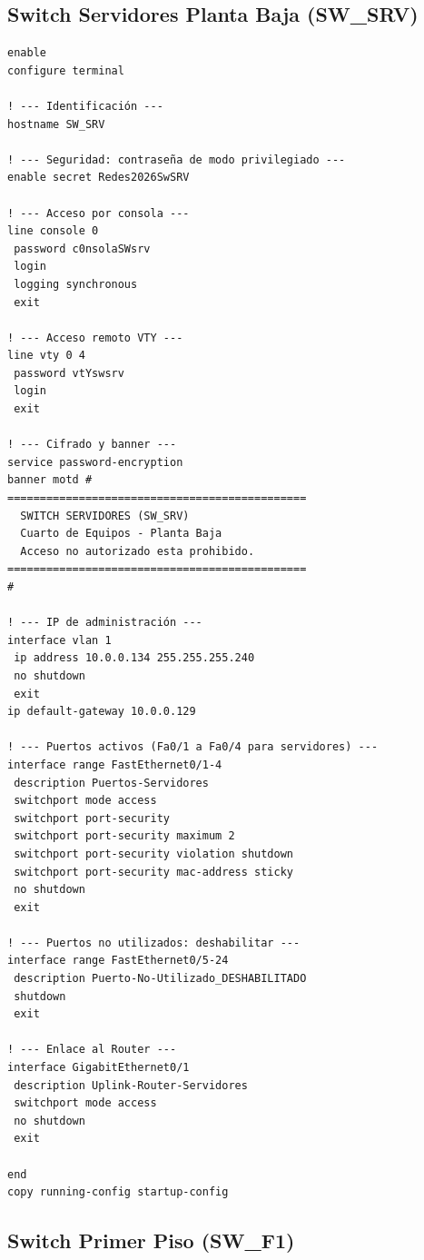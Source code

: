 \documentclass[letterpaper,11pt]{article}
\begin{document}
\subsection{Switch Servidores Planta Baja (SW\_SRV)}

\begin{lstlisting}[style=cisco, caption={Configuración completa de SW\_SRV}]
enable
configure terminal

! --- Identificación ---
hostname SW_SRV

! --- Seguridad: contraseña de modo privilegiado ---
enable secret Redes2026SwSRV

! --- Acceso por consola ---
line console 0
 password c0nsolaSWsrv
 login
 logging synchronous
 exit

! --- Acceso remoto VTY ---
line vty 0 4
 password vtYswsrv
 login
 exit

! --- Cifrado y banner ---
service password-encryption
banner motd #
==============================================
  SWITCH SERVIDORES (SW_SRV)
  Cuarto de Equipos - Planta Baja
  Acceso no autorizado esta prohibido.
==============================================
#

! --- IP de administración ---
interface vlan 1
 ip address 10.0.0.134 255.255.255.240
 no shutdown
 exit
ip default-gateway 10.0.0.129

! --- Puertos activos (Fa0/1 a Fa0/4 para servidores) ---
interface range FastEthernet0/1-4
 description Puertos-Servidores
 switchport mode access
 switchport port-security
 switchport port-security maximum 2
 switchport port-security violation shutdown
 switchport port-security mac-address sticky
 no shutdown
 exit

! --- Puertos no utilizados: deshabilitar ---
interface range FastEthernet0/5-24
 description Puerto-No-Utilizado_DESHABILITADO
 shutdown
 exit

! --- Enlace al Router ---
interface GigabitEthernet0/1
 description Uplink-Router-Servidores
 switchport mode access
 no shutdown
 exit

end
copy running-config startup-config
\end{lstlisting}

\subsection{Switch Primer Piso (SW\_F1)}
\end{document}
